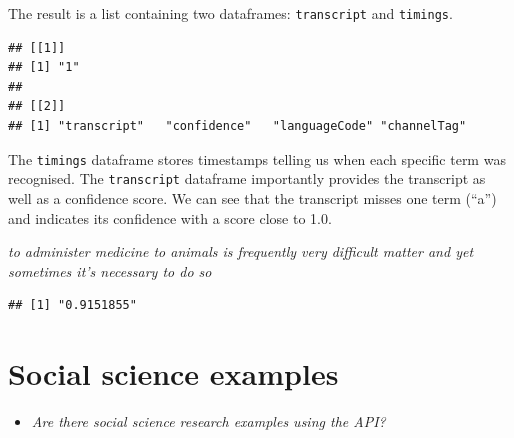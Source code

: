 \documentclass[
]{book}
\newenvironment{Shaded}{\begin{snugshade}}{\end{snugshade}}
\newcommand{\CommentTok}[1]{\textcolor[rgb]{0.56,0.35,0.01}{\textit{#1}}}
\newcommand{\FunctionTok}[1]{\textcolor[rgb]{0.00,0.00,0.00}{#1}}
\newcommand{\NormalTok}[1]{#1}
\newcommand{\SpecialCharTok}[1]{\textcolor[rgb]{0.00,0.00,0.00}{#1}}
\providecommand{\tightlist}{%
  \setlength{\itemsep}{0pt}\setlength{\parskip}{0pt}}
\begin{document}
The result is a list containing two dataframes: \texttt{transcript} and \texttt{timings}.

\begin{Shaded}
\end{Shaded}

\begin{verbatim}
## [[1]]
## [1] "1"
## 
## [[2]]
## [1] "transcript"   "confidence"   "languageCode" "channelTag"
\end{verbatim}

The \texttt{timings} dataframe stores timestamps telling us when each specific term was recognised. The \texttt{transcript} dataframe importantly provides the transcript as well as a confidence score. We can see that the transcript misses one term (``a'') and indicates its confidence with a score close to 1.0.

\begin{Shaded}
\end{Shaded}

\emph{to administer medicine to animals is frequently very difficult matter and yet sometimes it's necessary to do so}

\begin{Shaded}
\end{Shaded}

\begin{verbatim}
## [1] "0.9151855"
\end{verbatim}

\hypertarget{social-science-examples-4}{%
\section{Social science examples}\label{social-science-examples-4}}

\begin{itemize}
\tightlist
\item
  \emph{Are there social science research examples using the API?}
\end{itemize}
\end{document}
